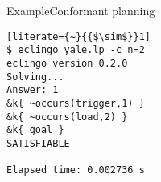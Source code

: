 \begin{frame}[fragile]{Example}{Conformant planning}
\begin{lstlisting}[literate={~}{{$\sim$}}1]
$ eclingo yale.lp -c n=2
eclingo version 0.2.0
Solving...
Answer: 1
&k{ ~occurs(trigger,1) } 
&k{ ~occurs(load,2) } 
&k{ goal }
SATISFIABLE

Elapsed time: 0.002736 s
\end{lstlisting}
\end{frame}
%
